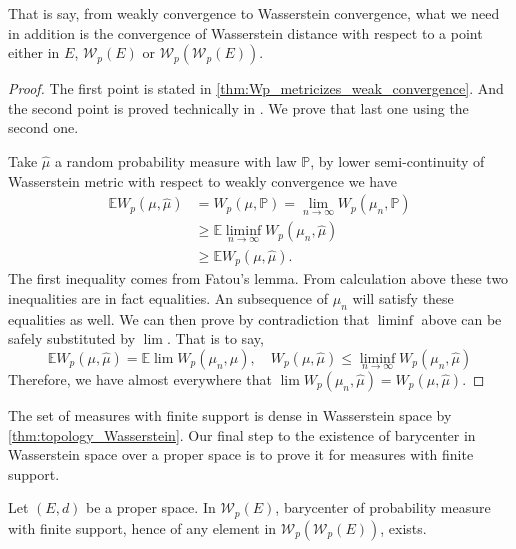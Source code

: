That is say,
from weakly convergence to Wasserstein convergence,
what we need in addition is the convergence of Wasserstein distance with respect to a point
either in $E$, $\mathcal{W}_p(E)$ or $\mathcal{W}_p(\mathcal{W}_p(E))$.

\begin{proof}
	The first point is stated in \cref{thm:Wp_metricizes_weak_convergence}.
	And	the second point is proved technically in \cite[Lemma 14]{le2017existence}.
	We prove that last one using the second one.

	Take $\hat{\mu}$ a random probability measure with law $\mathbb{P}$,
	by lower semi-continuity of Wasserstein metric with respect to weakly convergence we have
	\begin{align*}
		\mathbb{E}W_p(\mu, \hat{\mu}) & =W_p(\mu, \mathbb{P})=\lim_{n \rightarrow \infty} W_p(\mu_n, \mathbb{P}) \\
		                              & \geq \mathbb{E}\liminf_{n \rightarrow \infty} W_p(\mu_n, \hat{\mu})      \\
		                              & \geq \mathbb{E}W_p(\mu, \hat{\mu}).
	\end{align*}
	The first inequality comes from Fatou's lemma.
	From calculation above these two inequalities are in fact equalities.
	An subsequence of $\mu_n$ will satisfy these equalities as well.
	We can then prove by contradiction that $\liminf$ above can be safely substituted by $\lim$.
	That is to say,
	\[
		\mathbb{E}W_p(\mu, \hat{\mu}) = \mathbb{E}\lim W_p(\mu_n, \hat{\mu}),
		\quad W_p(\mu, \hat{\mu}) \leq \liminf_{n \rightarrow \infty} W_p(\mu_n, \hat{\mu})
	\]
	Therefore, we have almost everywhere that $\lim W_p(\mu_n, \hat{\mu})=W_p(\mu, \hat{\mu})$.
\end{proof}

The set of measures with finite support is dense in Wasserstein space by \cref{thm:topology_Wasserstein}.
Our final step to the existence of barycenter in Wasserstein space over a proper space
is to prove it for measures with finite support.

\begin{thm}
	\label{thm:barycenter_finite_support_measure}
	Let $(E,d)$ be a proper space.
	In $\mathcal{W}_p(E)$, barycenter of probability measure with finite support,
	hence of any element in $\mathcal{W}_p(\mathcal{W}_p(E))$,
	exists.
\end{thm}

